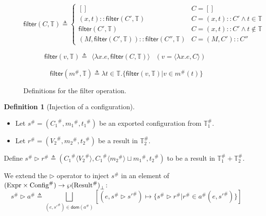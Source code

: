 \documentclass[acmsmall,screen,review]{acmart}
\theoremstyle{definition}
\newtheorem{definition}{Definition}[section]
\newcommand*{\cons}{::}
\newcommand*{\A}[1]{{#1}^{\#}}
\newcommand*{\Expr}{\text{Expr}}
\newcommand*{\Time}{\mathbb{T}}
\newcommand*{\ATime}{\A{\Time}}
\newcommand*{\mem}{m}
\newcommand*{\AConfig}[1]{\A{\text{Config}}\vphantom{#1}}
\newcommand*{\AResult}[1]{\A{\text{Result}}\vphantom{#1}}
\newcommand*{\filter}{\mathsf{filter}}
\begin{document}
\begin{figure}[htb]
  \footnotesize
  \[
    \filter(C,\Time)\triangleq
    \begin{cases}
      []                                           & C=[]                                \\
      (x,t)\cons\filter(C',\Time)                  & C=(x,t)\cons C'\wedge t\in\Time     \\
      \filter(C',\Time)                            & C=(x,t)\cons C'\wedge t\not\in\Time \\
      (M,\filter(C',\Time))\cons\filter(C'',\Time) & C=(M, C')\cons C''
    \end{cases}
  \]

  \[
    \filter(v,\Time)\triangleq
    \begin{array}{ll}
      \langle\lambda x.e,\filter(C,\Time)\rangle & (v=\langle\lambda x.e,C\rangle)
    \end{array}
  \]

  \[
    \filter(\A\mem,\Time)\triangleq
    \lambda t\in\Time.\{\filter(v,\Time)|v\in\A{m}(t)\}
  \]
  \caption{Definitions for the filter operation.}
\end{figure}

\begin{definition}[Injection of a configuration]
  $\:$

  \begin{itemize}
    \item Let $\A{s}=(\A{C_1},\A{\mem_1},\A{t_1})$ be an exported configuration from $\ATime_1$.
    \item Let $\A{r}=(\A{V_2},\A{\mem_2},\A{t_2})$ be a result in $\ATime_2$.
  \end{itemize}

  Define $\A{s}\rhd\A{r}\triangleq(\A{C_1}\langle\A{V_2}\rangle,\A{C_1}\langle\A{\mem_2}\rangle\sqcup\A{\mem_1},\A{t_2})$ to be a result in $\ATime_1+\ATime_2$.

  We extend the $\rhd$ operator to inject $\A{s}$ in an element of $(\Expr\times\AConfig{\ATime})\rightarrow{\wp(\AResult{\ATime})}_{\bot}$:
  \[
    \A{s}\rhd\A{a}\triangleq\bigsqcup_{(e,\A{s'})\in\mathsf{dom}(\A{a})}[(e,\A{s}\rhd\A{s'})\mapsto\{\A{s}\rhd\A{r}|\A{r}\in\A{a}(e,\A{s'})\}]
  \]
\end{definition}
\end{document}
